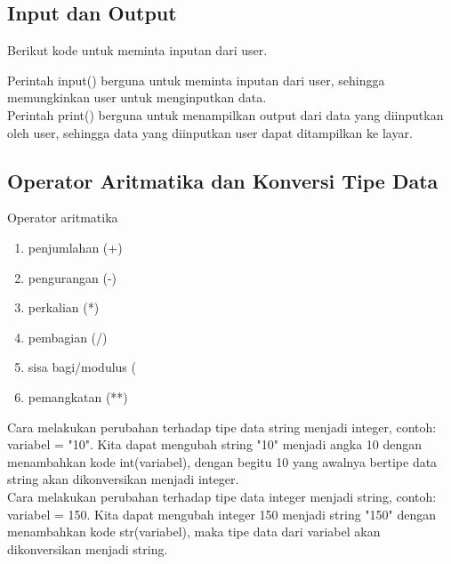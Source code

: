 \subsection{Input dan Output}
Berikut kode untuk meminta inputan dari user.

Perintah input() berguna untuk meminta inputan dari user, sehingga memungkinkan user untuk menginputkan data.\\
Perintah print() berguna untuk menampilkan output dari data yang diinputkan oleh user, sehingga data yang diinputkan user dapat ditampilkan ke layar.

\subsection{Operator Aritmatika dan Konversi Tipe Data}
Operator aritmatika
\begin{enumerate}
 \item penjumlahan (+)
 \item pengurangan (-)
 \item perkalian (*)
 \item pembagian (/)
 \item sisa bagi/modulus (%
 \item pemangkatan (**)
\end{enumerate}
Cara melakukan perubahan terhadap tipe data string menjadi integer, contoh: variabel = "10". Kita dapat mengubah string "10" menjadi angka 10 dengan menambahkan kode int(variabel), dengan begitu 10 yang awalnya bertipe data string akan dikonversikan menjadi integer.\\
Cara melakukan perubahan terhadap tipe data integer menjadi string, contoh: variabel = 150. Kita dapat mengubah integer 150 menjadi string "150" dengan menambahkan kode str(variabel), maka tipe data dari variabel akan dikonversikan menjadi string.

